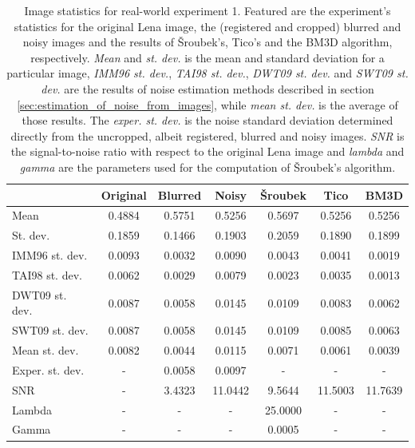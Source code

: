 \documentclass[12pt,notitlepage]{report}
\begin{document}
\begin{table}[htb]
  \centering
  \begin{tabular}{ | l | c | c | c | c | c | c | }
    \hline
		           & Original & Blurred & Noisy   & Šroubek & Tico    & BM3D    \\ \hline
	Mean           & 0.4884   & 0.5751  & 0.5256  & 0.5697  & 0.5256  & 0.5256  \\ \hline
	St. dev.       & 0.1859   & 0.1466  & 0.1903  & 0.2059  & 0.1890  & 0.1899  \\ \hline
	IMM96 st. dev. & 0.0093   & 0.0032  & 0.0090  & 0.0043  & 0.0041  & 0.0019  \\ \hline
	TAI98 st. dev. & 0.0062   & 0.0029  & 0.0079  & 0.0023  & 0.0035  & 0.0013  \\ \hline
	DWT09 st. dev. & 0.0087   & 0.0058  & 0.0145  & 0.0109  & 0.0083  & 0.0062  \\ \hline
	SWT09 st. dev. & 0.0087   & 0.0058  & 0.0145  & 0.0109  & 0.0085  & 0.0063  \\ \hline
	Mean st. dev.  & 0.0082   & 0.0044  & 0.0115  & 0.0071  & 0.0061  & 0.0039  \\ \hline
	Exper. st. dev.& -        & 0.0058  & 0.0097  & -       & -       & -       \\ \hline
	SNR            & -        & 3.4323  & 11.0442 & 9.5644  & 11.5003 & 11.7639 \\ \hline
	Lambda         & -        & -       & -       & 25.0000 & -       & -       \\ \hline
	Gamma          & -        & -       & -       & 0.0005  & -       & -       \\ \hline

  \end{tabular}
  \caption[Image statistics for real-world experiment 1]{Image statistics for real-world experiment 1. Featured are the experiment's statistics for the original Lena image, the (registered and cropped) blurred and noisy images and the results of Šroubek's, Tico's and the BM3D algorithm, respectively. {\em Mean} and {\em st. dev.} is the mean and standard deviation for a particular image, {\em IMM96 st. dev.}, {\em TAI98 st. dev.}, {\em DWT09 st. dev.} and {\em SWT09 st. dev.} are the results of noise estimation methods described in section \ref{sec:estimation_of_noise_from_images}, while {\em mean st. dev.} is the average of those results. The {\em exper. st. dev.} is the noise standard deviation determined directly from the uncropped, albeit registered, blurred and noisy images. {\em SNR} is the signal-to-noise ratio with respect to the original Lena image and {\em lambda} and {\em gamma} are the parameters used for the computation of Šroubek's algorithm.}
  \label{tab:experiment_001_statistics}
\end{table}
\end{document}
